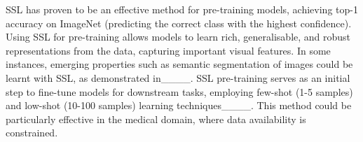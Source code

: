 SSL has proven to be an effective method for pre-training models, achieving top-1 accuracy on ImageNet (predicting the correct class with the highest confidence). Using SSL for pre-training allows models to learn rich, generalisable, and robust representations from the data, capturing important visual features. In some instances, emerging properties such as semantic segmentation of images could be learnt with SSL, as demonstrated in____. SSL pre-training serves as an initial step to fine-tune models for downstream tasks, employing few-shot (1-5 samples) and low-shot (10-100 samples) learning techniques____. This method could be particularly effective in the medical domain, where data availability is constrained. 

%
%
%